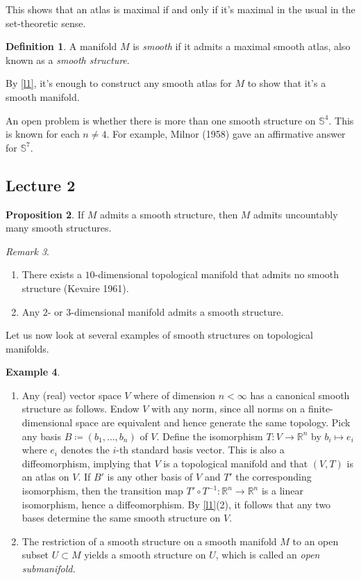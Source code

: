 \documentclass[10pt,letterpaper,cm]{nupset}
\theoremstyle{definition}
\newtheorem{definition}{Definition}[subsection]
\newtheorem{exmp}[definition]{Example}
\theoremstyle{theorem}
\newtheorem{prop}[definition]{Proposition}
\theoremstyle{remark}
\newtheorem{remark}[definition]{Remark}
\newcommand{\R}{\mathbb R}
\renewcommand{\S}{\mathbb S}
\newcommand{\1}{\mathbf{1}}
\newcommand{\0}{\vec 0}
\begin{document}
This shows that an atlas is maximal  if and only if it's maximal in the usual in the set-theoretic sense.

\theoremstyle{definition}
\begin{definition}{A manifold $M$ is \textit{smooth} if it admits a maximal smooth atlas, also known as a \textit{smooth structure}.}
\end{definition}

By \cref{l1}, it's enough to construct any smooth atlas for $M$ to show that it's a smooth manifold.

\medskip

An open problem is whether there is more than one smooth structure on $\S^4$. This is known for each $n \ne 4$. For example, Milnor (1958) gave an affirmative answer for $\S^7$.

\subsection{Lecture 2}


\begin{prop}
{If $M$ admits a smooth structure, then $M$ admits uncountably many smooth structures.} 
\end{prop}


\begin{remark} $ $
\begin{enumerate}
\item There exists a $10$-dimensional topological manifold that admits no smooth structure (Kevaire 1961).
\item Any $2$- or $3$-dimensional manifold admits a smooth structure.
\end{enumerate}
\end{remark}

\smallskip

Let us now look at several examples of smooth structures on topological manifolds.

\begin{exmp}\label{E1} $ $
\begin{enumerate}[label=(\arabic*)]
\item Any (real) vector space $V$ where of dimension  $n<\infty$ has a canonical smooth structure as follows. Endow $V$ with any norm, since all norms on a finite-dimensional space are equivalent and hence generate the same topology. Pick any basis $B\coloneqq  (b_1, \ldots, b_n)$ of $V$.  Define the isomorphism  $T: V \to \R^n$ by $b_i \mapsto e_i$ where $e_i$ denotes the $i$-th standard basis vector. This is also a diffeomorphism, implying that $V$ is a topological manifold and that $(V, T)$ is an atlas on $V$. If $B'$ is any other basis of $V$ and $T'$ the corresponding isomorphism, then the transition map $T' \circ T^{-1}: \R^n \to \R^n$ is a linear isomorphism, hence a diffeomorphism. By \cref{l1}(2), it follows that any two bases determine the same smooth structure on $V$. 
\item The restriction of a smooth structure on  a smooth manifold $M$ to an open subset $U \subset M$ yields a smooth structure on $U$, which is called an \textit{open submanifold.} 
\end{enumerate}
\end{exmp}
\end{document}
